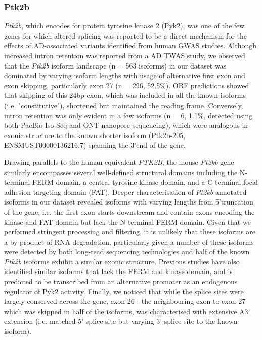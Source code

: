 \newpage
\subsubsection{Ptk2b}
\textit{Ptk2b}, which encodes for protein tyrosine kinase 2 (Pyk2), was one of the few genes for which altered splicing was reported to be a direct mechanism for the effects of AD-associated variants identified from human GWAS studies\cite{Raj2018}. Although increased intron retention was reported from a AD TWAS study\cite{Raj2018}, we observed that the \textit{Ptk2b} isoform landscape (n = 563 isoforms) in our dataset was dominated by varying isoform lengths with usage of alternative first exon and exon skipping, particularly exon 27 (n = 296, 52.5\%). ORF predictions showed that skipping of this 24bp exon, which was included in all the known isoforms (i.e. "constitutive"), shortened but maintained the reading frame. Conversely, intron retention was only evident in a few isoforms (n = 6, 1.1\%, detected using both PacBio Iso-Seq and ONT nanopore sequencing), which were analogous in exonic structure to the known shorter isoform (Ptk2b-205, ENSMUST00000136216.7) spanning the 3'end of the gene. 

Drawing parallels to the human-equivalent \textit{PTK2B}, the mouse \textit{Pt2kb} gene similarly encompasses several well-defined structural domains including the N-terminal FERM domain, a central tyrosine kinase domain, and a C-terminal focal adhesion targeting domain (FAT)\cite{DePins2021}. Deeper characterisation of \textit{Pt2kb}-annotated isoforms in our dataset revealed isoforms with varying lengths from 5'truncation of the gene; i.e. the first exon starts downstream and contain exons encoding the kinase and FAT domain but lack the N-terminal FERM domain. Given that we performed stringent processing and filtering, it is unlikely that these isoforms are a by-product of RNA degradation, particularly given a number of these isoforms were detected by both long-read sequencing technologies and half of the known \textit{Ptk2b} isoforms exhibit a similar exonic structure. Previous studies have also identified similar isoforms that lack the FERM and kinase domain, and is predicted to be transcribed from an alternative promoter as an endogenous regulator of Pyk2 activity\cite{DePins2021}. Finally, we noticed that while the splice sites were largely conserved across the gene, exon 26 - the neighbouring exon to exon 27 which was skipped in half of the isoforms, was characterised with extensive A3' extension (i.e. matched 5' splice site but varying 3' splice site to the known isoform). 

